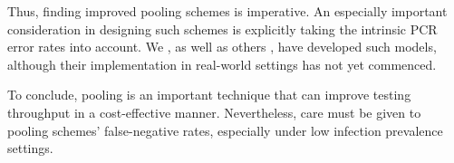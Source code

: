 \documentclass{article}
\begin{document}
Thus, finding improved pooling schemes is imperative. An especially
important consideration in designing such schemes is explicitly taking
the intrinsic PCR error rates into account. We \cite{DOPE}, as well as
others \cite{BayesianDorfman}, have developed such models, although their
implementation in real-world settings has not yet commenced.







To conclude, pooling is an important technique that can improve
testing throughput in a cost-effective manner. Nevertheless, care must
be given to pooling schemes' false-negative rates, especially under
low infection prevalence settings.



\end{document}
